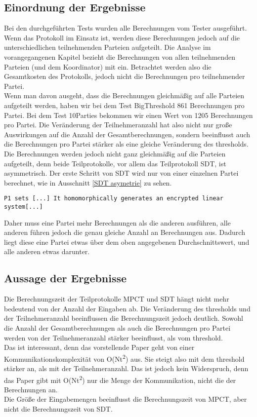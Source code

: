 \subsection{Einordnung der Ergebnisse}
Bei den durchgeführten Tests wurden alle Berechnungen vom Tester ausgeführt. Wenn das Protokoll im Einsatz ist, werden diese Berechnungen jedoch auf die unterschiedlichen teilnehmenden Parteien aufgeteilt. Die Analyse im vorangegangenen Kapitel bezieht die Berechnungen von allen teilnehmenden Parteien (und dem Koordinator) mit ein. Betrachtet werden also die Gesamtkosten des Protokolls, jedoch nicht die Berechnungen pro teilnehmender Partei.\\
Wenn man davon ausgeht, dass die Berechnungen gleichmäßig auf alle Parteien aufgeteilt werden, haben wir bei dem Test BigThreshold 861 Berechnungen pro Partei. Bei dem Test 10Parties bekommen wir einen Wert von 1205 Berechnungen pro Partei. Die Veränderung der Teilnehmeranzahl hat also nicht nur große Auswirkungen auf die Anzahl der Gesamtberechnungen, sondern beeinflusst auch die Berechnungen pro Partei stärker als eine gleiche Veränderung des thresholds.\\
Die Berechnungen werden jedoch nicht ganz gleichmäßig auf die Parteien aufgeteilt, denn beide Teilprotokolle, vor allem das Teilprotokoll SDT, ist asymmetrisch. Der erste Schritt von SDT wird nur von einer einzelnen Partei berechnet, wie in Ausschnitt \ref{SDT asymetrie} zu sehen. 
\begin{lstlisting}[caption = Ausschnitt des Teilprotokolls SDT \cite{Doettling2021}, label = SDT asymetrie]
P1 sets [...] It homomorphically generates an encrypted linear system[...]
\end{lstlisting}
Daher muss eine Partei mehr Berechnungen als die anderen ausführen, alle anderen führen jedoch die genau gleiche Anzahl an Berechnungen aus. Dadurch liegt diese eine Partei etwas über dem oben angegebenen Durchschnittswert, und alle anderen etwas darunter.\\

\subsection{Aussage der Ergebnisse}
Die Berechnungszeit der Teilprotokolle MPCT und SDT hängt nicht mehr bedeutend von der Anzahl der Eingaben ab. Die Veränderung des thresholds und der Teilnehmeranzahl beeinflussen die Berechnungszeit jedoch deutlich. Sowohl die Anzahl der Gesamtberechnungen als auch die Berechnungen pro Partei werden von der Teilnehmeranzahl stärker beeinflusst, als vom threshold.\\
Das ist interessant, denn das vorstellende Paper \cite{Doettling2021} geht von einer Kommunikationskomplexität von O(Nt\textsuperscript{2}) aus. Sie steigt also mit dem threshold stärker an, als mit der Teilnehmeranzahl. Das ist jedoch kein Widerspruch, denn das Paper gibt mit O(Nt\textsuperscript{2}) nur die Menge der Kommunikation, nicht die der Berechnungen an.\\
Die Größe der Eingabemengen beeinflusst die Berechnungszeit von MPCT, aber nicht die Berechnungszeit von SDT.\\
